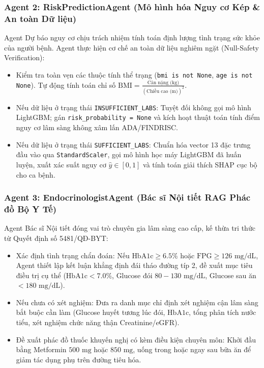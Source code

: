 \documentclass[12pt,a4paper]{article}
\begin{document}
\subsubsection{Agent 2: RiskPredictionAgent (Mô hình hóa Nguy cơ Kép \& An toàn Dữ liệu)}
Agent Dự báo nguy cơ chịu trách nhiệm tính toán định lượng tình trạng sức khỏe của người bệnh. Agent thực hiện cơ chế an toàn dữ liệu nghiêm ngặt (Null-Safety Verification):
\begin{itemize}[leftmargin=1.2cm]
    \item Kiểm tra toàn vẹn các thuộc tính thể trạng (\texttt{bmi is not None}, \texttt{age is not None}). Tự động tính toán chỉ số $\text{BMI} = \frac{\text{Cân nặng (kg)}}{(\text{Chiều cao (m)})^2}$.
    \item Nếu dữ liệu ở trạng thái \texttt{INSUFFICIENT\_LABS}: Tuyệt đối không gọi mô hình LightGBM; gán \texttt{risk\_probability = None} và kích hoạt thuật toán tính điểm nguy cơ lâm sàng không xâm lấn ADA/FINDRISC.
    \item Nếu dữ liệu ở trạng thái \texttt{SUFFICIENT\_LABS}: Chuẩn hóa vector 13 đặc trưng đầu vào qua \texttt{StandardScaler}, gọi mô hình học máy LightGBM đã huấn luyện, xuất xác suất nguy cơ $\hat{y} \in [0, 1]$ và tính toán giải thích SHAP cục bộ cho ca bệnh.
\end{itemize}

\subsubsection{Agent 3: EndocrinologistAgent (Bác sĩ Nội tiết RAG Phác đồ Bộ Y Tế)}
Agent Bác sĩ Nội tiết đóng vai trò chuyên gia lâm sàng cao cấp, kế thừa tri thức từ Quyết định số 5481/QĐ-BYT:
\begin{itemize}[leftmargin=1.2cm]
    \item Xác định tình trạng chẩn đoán: Nếu $\text{HbA1c} \ge 6.5\%$ hoặc $\text{FPG} \ge 126\text{ mg/dL}$, Agent thiết lập kết luận khẳng định đái tháo đường típ 2, đề xuất mục tiêu điều trị cụ thể ($\text{HbA1c} < 7.0\%$, Glucose đói $80 - 130\text{ mg/dL}$, Glucose sau ăn $< 180\text{ mg/dL}$).
    \item Nếu chưa có xét nghiệm: Đưa ra danh mục chỉ định xét nghiệm cận lâm sàng bắt buộc cần làm (Glucose huyết tương lúc đói, $\text{HbA1c}$, tổng phân tích nước tiểu, xét nghiệm chức năng thận Creatinine/eGFR).
    \item Đề xuất phác đồ thuốc khuyến nghị có kèm điều kiện chuyên môn: Khởi đầu bằng Metformin $500\text{ mg}$ hoặc $850\text{ mg}$, uống trong hoặc ngay sau bữa ăn để giảm tác dụng phụ trên đường tiêu hóa.
\end{itemize}
\end{document}
